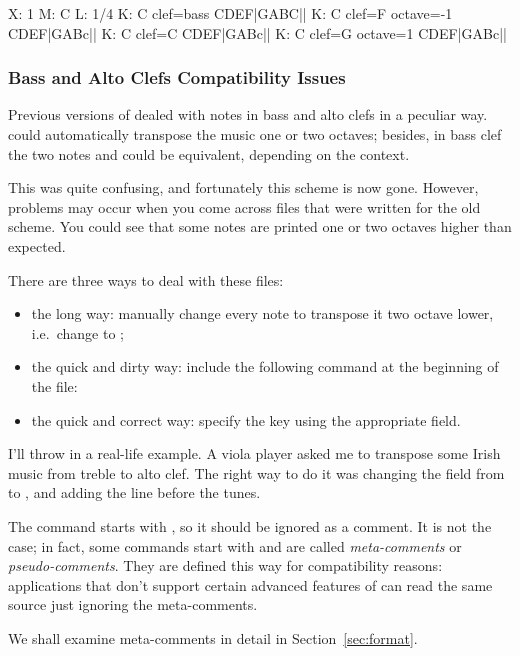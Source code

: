 \documentclass[a4paper,12pt]{book}
\begin{document}
\begin{abcsource}
X: 1
M: C
L: 1/4
K: C clef=bass
%
CDEF|GABC||
K: C clef=F octave=-1
CDEF|GABc||
K: C clef=C
CDEF|GABc||
K: C clef=G octave=1
CDEF|GABc||
\end{abcsource}



\subsubsection{Bass and Alto Clefs Compatibility Issues}
\label{sec:bassclef}

Previous versions of \abcm{} dealed with notes in bass and alto clefs
in a peculiar way. \abcm{} could automatically transpose the music one
or two octaves; besides, in bass clef the two notes  and
 could be equivalent, depending on the context.

This was quite confusing, and fortunately this scheme is now gone.
However, problems may occur when you come across files that were
written for the old scheme. You could see that some notes are printed
one or two octaves higher than expected.

There are three ways to deal with these files:

\begin{itemize}
  
  \item the long way: manually change every note to transpose it two
  octave lower, i.e.\ change  to ;
  
  \item the quick and dirty way: include the following command at the
  beginning of the file: 
  
  \item the quick and correct way: specify the key using the appropriate
   field.

\end{itemize}

I'll throw in a real-life example. A viola player asked me to transpose
some Irish music from treble to alto clef. The right way to do it was
changing the  field from  to ,
and adding the  line before the tunes.

\begin{note}

  The  command starts with \car{\%}, so it
  should be ignored as a comment. It is not the case; in fact, some
  commands start with \car{\%\%} and are called \emph{meta-comments}
  or \emph{pseudo-comments}. They are defined this way for
  compatibility reasons: applications that don't support certain
  advanced features of \ABC{} can read the same source just ignoring
  the meta-comments.
  
  We shall examine meta-comments in detail in
  Section~\ref{sec:format}.

\end{note}
\end{document}
